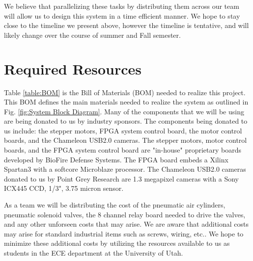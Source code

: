 \documentclass[11pt,english]{article}
\begin{document}
We believe that parallelizing these tasks by distributing them across our team will allow us to design this system in a time efficient manner. We hope to stay close to the timeline we present above, however the timeline is tentative, and will likely change over the course of summer and Fall semester.

\section{Required Resources}
Table \ref{table:BOM} is the Bill of Materials (BOM) needed to realize this project. This BOM defines the main materials needed to realize the system as outlined in Fig. \ref{fig:System Block Diagram}.
Many of the components that we will be using are being donated to us by industry sponsors. The components being donated to us include: the stepper motors, FPGA system control board, the
motor control boards, and the Chameleon USB2.0 cameras. The stepper motors, motor control boards, and the FPGA system control board are "in-house" proprietary boards developed by BioFire Defense Systems.
The FPGA board embeds a Xilinx Spartan3 with a softcore Microblaze processor. The Chameleon USB2.0 cameras donated to us by Point Grey Research are 1.3 megapixel cameras with a Sony ICX445 CCD, 1/3", 3.75 micron sensor.

As a team we will be distributing the cost of the pneumatic air cylinders, pneumatic solenoid valves, the 8 channel relay board needed to drive the valves, and any other unforseen costs
that may arise. We are aware that additional costs may arise for standard industrial items such as screws, wiring, etc.. We hope to minimize these additional costs by utilizing the resources
available to us as students in the ECE department at the University of Utah.
\end{document}
